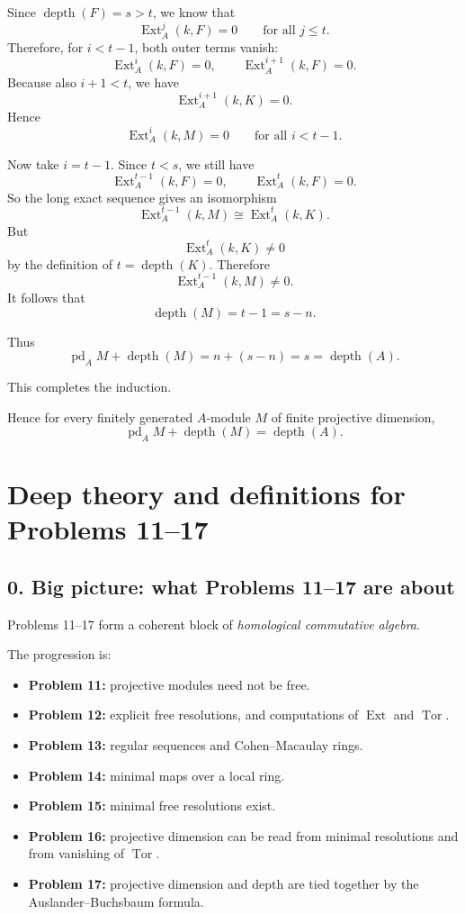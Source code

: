 \documentclass[12pt,a4paper]{article}
\theoremstyle{plain}
\theoremstyle{definition}      %
\begin{document}
Since \(\operatorname{depth}(F)=s>t\), we know that
\[
\operatorname{Ext}_A^j(k,F)=0
\qquad\text{for all }j\le t.
\]
Therefore, for \(i<t-1\), both outer terms vanish:
\[
\operatorname{Ext}_A^i(k,F)=0,
\qquad
\operatorname{Ext}_A^{i+1}(k,F)=0.
\]
Because also \(i+1<t\), we have
\[
\operatorname{Ext}_A^{i+1}(k,K)=0.
\]
Hence
\[
\operatorname{Ext}_A^i(k,M)=0
\qquad\text{for all }i<t-1.
\]

Now take \(i=t-1\). Since \(t<s\), we still have
\[
\operatorname{Ext}_A^{t-1}(k,F)=0,
\qquad
\operatorname{Ext}_A^{t}(k,F)=0.
\]
So the long exact sequence gives an isomorphism
\[
\operatorname{Ext}_A^{t-1}(k,M)\cong \operatorname{Ext}_A^t(k,K).
\]
But
\[
\operatorname{Ext}_A^t(k,K)\neq 0
\]
by the definition of \(t=\operatorname{depth}(K)\). Therefore
\[
\operatorname{Ext}_A^{t-1}(k,M)\neq 0.
\]
It follows that
\[
\operatorname{depth}(M)=t-1=s-n.
\]

Thus
\[
\operatorname{pd}_A M+\operatorname{depth}(M)
=
n+(s-n)=s=\operatorname{depth}(A).
\]

This completes the induction.

\medskip

Hence for every finitely generated \(A\)-module \(M\) of finite projective dimension,
\[
\boxed{
	\operatorname{pd}_A M+\operatorname{depth}(M)=\operatorname{depth}(A).
}
\]	
	
\section*{Deep theory and definitions for Problems 11--17}

\subsection*{0. Big picture: what Problems 11--17 are about}

Problems 11--17 form a coherent block of \emph{homological commutative algebra}.

The progression is:

\begin{itemize}
	\item \textbf{Problem 11:} projective modules need not be free.
	\item \textbf{Problem 12:} explicit free resolutions, and computations of \(\operatorname{Ext}\) and \(\operatorname{Tor}\).
	\item \textbf{Problem 13:} regular sequences and Cohen--Macaulay rings.
	\item \textbf{Problem 14:} minimal maps over a local ring.
	\item \textbf{Problem 15:} minimal free resolutions exist.
	\item \textbf{Problem 16:} projective dimension can be read from minimal resolutions and from vanishing of \(\operatorname{Tor}\).
	\item \textbf{Problem 17:} projective dimension and depth are tied together by the Auslander--Buchsbaum formula.
\end{itemize}
\end{document}
